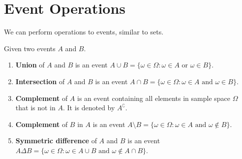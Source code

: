 \documentclass{huhtakm-template-book}
\begin{document}
\section{Event Operations}
We can perform operations to events, similar to sets.
\begin{defn}
	Given two events $A$ and $B$.
	\begin{enumerate}
		\item \textbf{Union} of $A$ and $B$ is an event $A\cup B=\{\omega\in\Omega:\omega\in A\text{ or }\omega\in B\}$.
		\item \textbf{Intersection} of $A$ and $B$ is an event $A\cap B=\{\omega\in\Omega:\omega\in A\text{ and }\omega\in B\}$.
		\item \textbf{Complement} of $A$ is an event containing all elements in sample space $\Omega$ that is not in $A$. It is denoted by $A^{\complement}$.
		\item \textbf{Complement} of $B$ in $A$ is an event $A\setminus B=\{\omega\in\Omega:\omega\in A\text{ and }\omega\not\in B\}$.
		\item \textbf{Symmetric difference} of $A$ and $B$ is an event $A\Delta B=\{\omega\in\Omega:\omega\in A\cup B\text{ and }\omega\not\in A\cap B\}$.
	\end{enumerate}
\end{defn}
\end{document}

